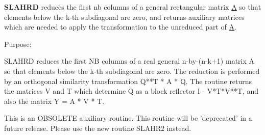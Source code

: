 {\bfseries S\+L\+A\+H\+R\+D} reduces the first nb columns of a general rectangular matrix \hyperlink{classA}{A} so that elements below the k-\/th subdiagonal are zero, and returns auxiliary matrices which are needed to apply the transformation to the unreduced part of \hyperlink{classA}{A}. 

 \begin{DoxyParagraph}{Purpose\+: }
\begin{DoxyVerb} SLAHRD reduces the first NB columns of a real general n-by-(n-k+1)
 matrix A so that elements below the k-th subdiagonal are zero. The
 reduction is performed by an orthogonal similarity transformation
 Q**T * A * Q. The routine returns the matrices V and T which determine
 Q as a block reflector I - V*T*V**T, and also the matrix Y = A * V * T.

 This is an OBSOLETE auxiliary routine. 
 This routine will be 'deprecated' in a  future release.
 Please use the new routine SLAHR2 instead.\end{DoxyVerb}
 
\end{DoxyParagraph}


